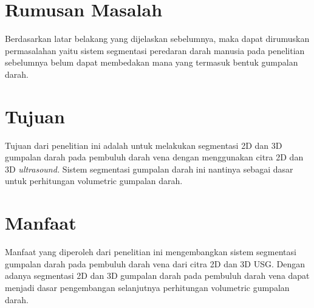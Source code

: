 

  


\section{Rumusan Masalah}
Berdasarkan latar belakang yang dijelaskan sebelumnya, maka dapat dirumuskan permasalahan yaitu sistem segmentasi peredaran darah manusia pada penelitian sebelumnya belum dapat membedakan mana yang termasuk bentuk gumpalan darah. 
\section{Tujuan}
Tujuan dari penelitian ini adalah untuk melakukan segmentasi 2D dan 3D gumpalan darah pada pembuluh darah vena dengan menggunakan citra 2D dan 3D \textit{ultrasound.} Sistem segmentasi gumpalan darah ini nantinya sebagai dasar untuk perhitungan volumetric gumpalan darah.

\section{Manfaat}
Manfaat yang diperoleh dari penelitian ini mengembangkan sistem segmentasi gumpalan darah pada pembuluh darah vena dari citra 2D dan 3D USG. Dengan adanya segmentasi 2D dan 3D gumpalan darah pada pembuluh darah vena dapat menjadi dasar pengembangan selanjutnya perhitungan volumetric gumpalan darah. 
%
